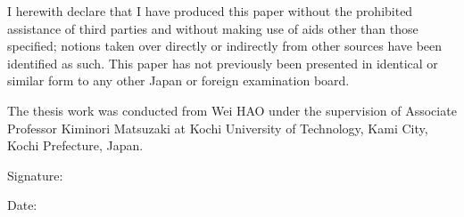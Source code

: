 
\begin{declaration}

I herewith declare that I have produced this paper without the prohibited
assistance of third parties and without making use of aids other than those
specified; notions taken over directly or indirectly from other sources have
been identified as such. This paper has not previously been presented in
identical or similar form to any other Japan or foreign examination board.

The thesis work was conducted from Wei HAO under the supervision of Associate
Professor Kiminori Matsuzaki at Kochi University of Technology, Kami City, Kochi
Prefecture, Japan.

\vspace{70mm}

\hspace{80mm} Signature:

\hspace{80mm} Date:

\end{declaration}

